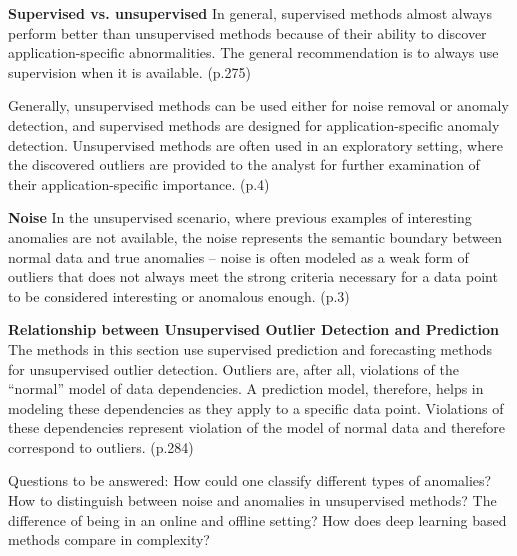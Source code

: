\textbf{Supervised vs. unsupervised} 
In general, supervised methods almost always perform better than unsupervised methods because of their ability to discover application-specific abnormalities. The general recommendation is to always use supervision when it is available. (p.275)

Generally, unsupervised methods can be used either for noise removal or anomaly detection, and supervised methods are designed for application-specific anomaly detection. Unsupervised methods are often used in an exploratory setting, where the discovered outliers are provided to the analyst for further examination of their application-specific importance. (p.4)

\textbf{Noise}
In the unsupervised scenario, where previous examples of interesting anomalies are not available, the noise represents the semantic boundary between normal data and true anomalies – noise is often modeled as a weak form of outliers that does not always meet the strong criteria necessary for a data point to be considered interesting or anomalous enough. (p.3)

\textbf{Relationship between Unsupervised Outlier Detection and
Prediction}
The methods in this section use supervised prediction and forecasting methods for unsupervised outlier detection. Outliers are, after all, violations of the “normal” model of data dependencies. A prediction model, therefore, helps in modeling these dependencies as they apply to a specific data point. Violations of these dependencies represent violation of the model of normal data and therefore correspond to outliers. (p.284)


Questions to be answered:
How could one classify different types of anomalies?
How to distinguish between noise and anomalies in unsupervised methods?
The difference of being in an online and offline setting?
How does deep learning based methods compare in complexity?